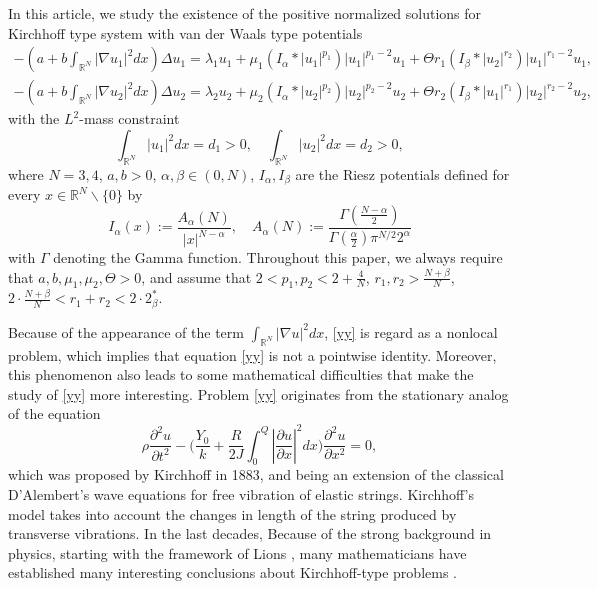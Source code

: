 \documentclass[10pt,a4paper]{amsart}
\numberwithin{equation}{section}
\begin{document}
In this article, we study the existence of the positive normalized solutions for
Kirchhoff type system with van der Waals type potentials
\begin{equation}\label{yy}
\begin{gathered}
-(a+b\int_{\mathbb{R}^N}|\nabla u_1|^2dx)\Delta u_1
=\lambda_1 u_1+\mu_1(I_\alpha\ast|u_1|^{p_1})|u_1|^{p_1-2}u_1+
 \Theta r_1(I_\beta\ast|u_2|^{r_2})|u_1|^{r_1-2}u_1, \\
-(a+b\int_{\mathbb{R}^N}|\nabla u_2|^2dx)\Delta u_2
=\lambda_2 u_2+\mu_2(I_\alpha\ast|u_2|^{p_2})|u_2|^{p_2-2}u_2+
 \Theta r_2(I_\beta\ast|u_1|^{r_1})|u_2|^{r_2-2}u_2,
\end{gathered}
\end{equation}
with the $L^2$-mass constraint
\begin{equation}\label{yues}
 \int_{\mathbb{R}^N}|u_1|^2dx=d_1>0,\quad
 \int_{\mathbb{R}^N}|u_2|^2dx=d_2>0,
\end{equation}
where $N=3,4$, $a,b>0$, $\alpha,\beta\in(0,N)$, $I_\alpha,I_\beta$ are the Riesz
potentials defined for every $x\in\mathbb{R}^N\backslash\{0\}$ by
\begin{equation}\label{gamma}
 I_\alpha(x):=\frac{A_\alpha(N)}{|x|^{N-\alpha}},\quad
 A_\alpha(N):=\frac{\Gamma(\frac{N-\alpha}{2})}{\Gamma(\frac{\alpha}{2})\pi^{N/2}
 2^\alpha}
\end{equation}
with $\Gamma$ denoting the Gamma function. Throughout this paper, we always require
that $a,b,\mu_1,\mu_2,\Theta>0$, and assume that $2<p_1,p_2
<2+\frac{4}{N}$, $r_1,r_2>\frac{N+\beta}{N}$,
$2\cdot\frac{N+\beta}{N}<r_1+r_2<2\cdot2_\beta^*$.

Because of the appearance of the term $\int_{\mathbb{R}^N}|\nabla u|^2dx$,
\eqref{yy} is regard as a nonlocal problem, which implies that equation \eqref{yy}
is not a pointwise identity. Moreover, this phenomenon also leads to some mathematical
difficulties that make the study of \eqref{yy} more interesting.
Problem \eqref{yy} originates
from the stationary analog of the equation
\[
\rho\frac{\partial^2 u}{\partial t^2}
-\Big(\frac{Y_0}{k}+\frac{R}{2J}\int_{0}^{Q}|\frac{\partial u}{\partial x}|^2dx\Big)
\frac{\partial^2 u}{\partial x^2}=0,
\]
which was proposed by Kirchhoff \cite{Kf4} in 1883, and being an extension of the
classical D'Alembert's wave equations for free vibration of elastic strings.
Kirchhoff's model takes into account the changes in length of the string produced by
transverse vibrations. In the last decades, Because of the strong background in physics,
starting with the framework of Lions \cite{Li4}, many mathematicians have established
many interesting conclusions about Kirchhoff-type problems
\cite{Kf1,Kf2,Kf3,Kf4,Kf5,Kf6,ygg,guo1,guo2}.
\end{document}
